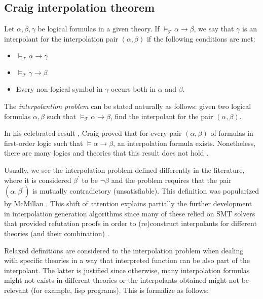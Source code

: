 \subsection{Craig interpolation theorem}

Let $\alpha, \beta, \gamma$ be logical formulas in a given theory. If
$\models_{\mathcal{T}} \alpha \rightarrow \beta$, we say that $\gamma$ is an
interpolant for the interpolation pair $(\alpha, \beta)$ if the following conditions
are met:

\begin{itemize}
\item $\models_{\mathcal{T}} \alpha \rightarrow \gamma$
\item $\models_{\mathcal{T}} \gamma \rightarrow \beta$
\item Every non-logical symbol in $\gamma$ occurs both in $\alpha$ and
  $\beta$.
\end{itemize}

The \emph{interpolantion problem} can be stated naturally as 
follows: given two logical formulas $\alpha, \beta$ such that 
$\models_{\mathcal{T}} \alpha \rightarrow \beta$, find
the interpolant for the pair $(\alpha, \beta)$.

In his celebrated result \cite{10.2307/2963594}, Craig proved that for every pair
$(\alpha, \beta)$ of formulas in first-order logic such that
$\models \alpha \rightarrow \beta$, an interpolation formula exists. Nonetheless,
there are many logics and theories that this result does not hold \cite{komori1978}.

Usually, we see the interpolation problem defined differently in the literature, 
where it is considered $\beta^{'}$ to be $\neg \beta$ and 
the problem requires that the pair $(\alpha, \beta^{'})$
is mutually contradictory (unsatisfiable). This definition was popularized by 
McMillan \cite{10.1007/978-3-540-24730-2_2}. This shift of attention explains 
partially the further development in interpolation generation algorithms 
since many of these relied on SMT solvers that provided refutation proofs 
in order to (re)construct interpolants for different theories (and their 
combination) \cite{10.1007/978-3-642-02959-2_17, 
10.1007/978-3-642-36742-7_9, mcmillan2011interpolants}.

Relaxed definitions are considered to the interpolation 
problem when dealing with specific
theories \cite{10.1007/11532231_26} in a way that interpreted 
function can be also part of the interpolant. The latter is 
justified since otherwise, many interpolation formulas might
not exists in different theories or the interpolants obtained might not 
be relevant (for example, lisp programs). This is formalize as follows:

